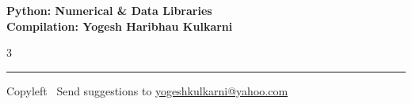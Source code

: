 \documentclass[8pt,landscape]{article}
\begin{document}
\footnotesize


\begin{center}
\Large{\textbf{Python: Numerical \& Data Libraries\\ Compilation: Yogesh Haribhau Kulkarni}}
\end{center}

\begin{multicols}{3}

\end{multicols}

\rule{\linewidth}{0.25pt}
\scriptsize
Copyleft \textcopyleft\  Send suggestions to
\href{http://www.yogeshkulkarni.com}{yogeshkulkarni@yahoo.com}
\end{document}
